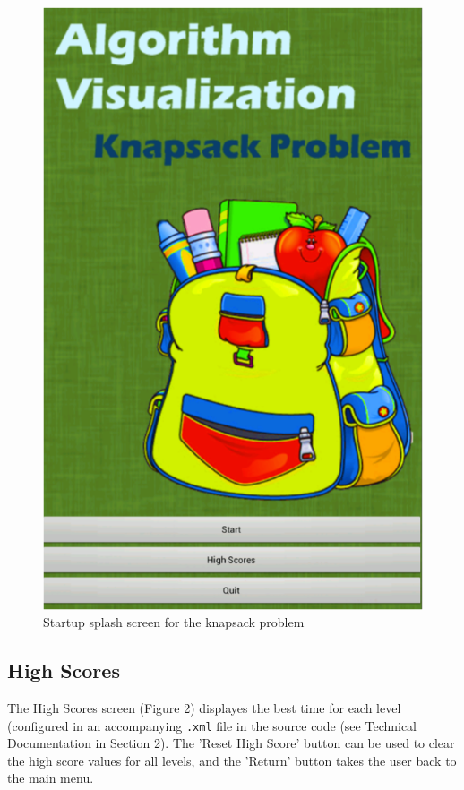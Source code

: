 \documentclass[11pt]{article}
\begin{document}
\begin{figure}[h]
\centering
\includegraphics[scale=0.65]{splash_screen.png}
\caption{Startup splash screen for the knapsack problem}
\end{figure}

\subsection{High Scores}

The High Scores screen (Figure 2) displayes the best time for each level
(configured in an accompanying \texttt{.xml} file in the source code (see
Technical Documentation in Section 2).  The 'Reset High Score' button can be
used to clear the high score values for all levels, and the 'Return' button
takes the user back to the main menu.
\end{document}

